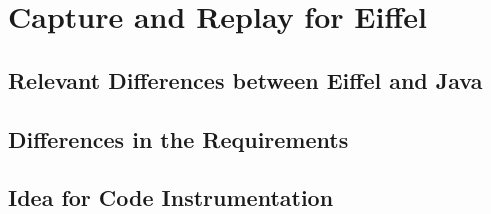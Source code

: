 \chapter{Capture and Replay for Eiffel}
\section{Relevant Differences between Eiffel and Java}
\section{Differences in the Requirements}
\section{Idea for Code Instrumentation}


